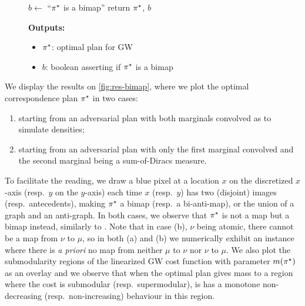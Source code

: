 \begin{figure}[h]
\begin{minipage}{.8\linewidth}
\begin{algorithm}[H]
\begin{algorithmic}[1]
                            \State $b\gets$ ``$\pi^\star$ is a bimap''
                            \State return $\pi^\star$, $b$
                            \end{algorithmic}
                            \vspace{3mm}
                        \textbf{Outputs:}
                        \begin{itemize}[nolistsep]
                            \item $\pi^\star$: optimal plan for GW
                            \item $b$: boolean asserting if $\pi^\star$ is a bimap
                        \end{itemize}
                      \end{algorithm}
                    \end{minipage}
                  \end{figure}

                    We display the results on \cref{fig:res-bimap}, where we plot the optimal correspondence plan $\pi^\star$
                    in two cases:
                    \begin{enumerate}[label=(\alph*),nolistsep]
                        \item starting from an adversarial plan with both marginals convolved as to simulate densities;
                        \item starting from an adversarial plan with only the first marginal convolved and the second marginal being a sum-of-Diracs measure.
                    \end{enumerate}
                    To facilitate the reading, we draw a blue pixel at a location $x$ on the discretized $x$-axis (resp.~$y$ on the $y$-axis) each time $x$ (resp.~$y$) has two (disjoint) images (resp.~antecedents), making $\pi^\star$ a bimap (resp.~a bi-anti-map), or the union of a graph and an anti-graph.
                    In both cases, we observe that $\pi^\star$ is not a map but a bimap instead, similarly to \cite[Sec.~4.5]{chiappori2010hedonic}. Note that in case (b), $\nu$ being atomic, there cannot be a map from $\nu$ to $\mu$, so in both (a) and (b) we numerically exhibit an instance where there is \textit{a priori} no map from neither $\mu$ to $\nu$ nor $\nu$ to $\mu$.
                    We also plot the submodularity regions of the linearized GW cost function with parameter $m(\pi^\star)$ as an overlay and we observe that when the optimal plan gives mass to a region where the cost is submodular (resp.~supermodular), is has a monotone non-decreasing (resp.~non-increasing) behaviour in this region.

